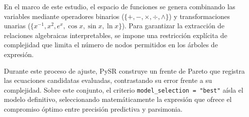 \documentclass[11pt, a4paper]{article}
\begin{document}
En el marco de este estudio, el espacio de funciones se genera combinando las variables mediante operadores binarios ($\{+, -, \times, \div, \wedge\}$) y transformaciones unarias ($\{x^{-1}, x^2, e^x, \cos x, \sin x, \ln x\}$). Para garantizar la extracción de relaciones algebraicas interpretables, se impone una restricción explícita de complejidad que limita el número de nodos permitidos en los árboles de expresión. 

Durante este proceso de ajuste, PySR construye un frente de Pareto que registra las ecuaciones candidatas evaluadas, contrastando su error frente a su complejidad. Sobre este conjunto, el criterio \texttt{model\_selection = "best"} aísla el modelo definitivo, seleccionando matemáticamente la expresión que ofrece el compromiso óptimo entre precisión predictiva y parsimonia.
\end{document}
